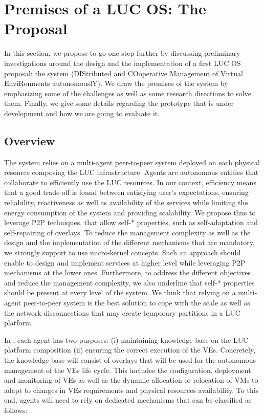 \section{Premises of a LUC OS: The \discovery Proposal\label{sec:archi}}

In this section, we propose to go one step further by discussing preliminary
investigations around the design and the implementation of a first LUC OS
proposal: the \discovery system (DIStributed and COoperative Management of
Virtual EnviRonments autonomouslY). We draw the premises of the \discovery
system by emphasizing some of the challenges as well as some research directions
to solve them. Finally, we give some details regarding the prototype that is
under development and how we are going to evaluate it.  

\subsection{Overview}

The \discovery system relies on a multi-agent peer-to-peer system deployed on
each physical resource composing the LUC infrastructure. Agents are autonomous
entities that collaborate to efficiently use the LUC resources. In our context,
efficiency means that a good trade-off is found between satisfying user's
expectations, ensuring reliability, reactiveness as well as availability of the
services while limiting the energy consumption of the system and providing
scalability. We propose thus to leverage P2P techniques, that
allow self-* properties, such as self-adaptation and self-repairing of overlays. 
%
To reduce the management complexity as well as the design and the
implementation of the different mechanisms that are mandatory, we strongly
support to use micro-kernel concepts. Such an approach should enable to design
and implement services at higher level while leveraging P2P mechanisms
at the lower ones.  Furthermore, to address the different objectives and reduce
the management complexity, we also underline that self-* properties should be
present at every level of the system.  We think that relying on a multi-agent
peer-to-peer system is the best solution to cope with the scale as well as the
network disconnections that may create temporary partitions in a LUC platform.

In \discovery, each agent has two purposes: (i) maintaining knowledge base on the
LUC platform composition (ii) ensuring the correct execution of the VEs. 
Concretely, the knowledge base will consist of overlays that will be used 
for the autonomous management of the
VEs life cycle. This includes the configuration, deployment and monitoring of
VEs as well as the dynamic allocation or relocation of VMs to adapt to changes
in VEs requirements and physical resources availability. To this end, agents
will need to rely on dedicated mechanisms that can be classified as follows: 

